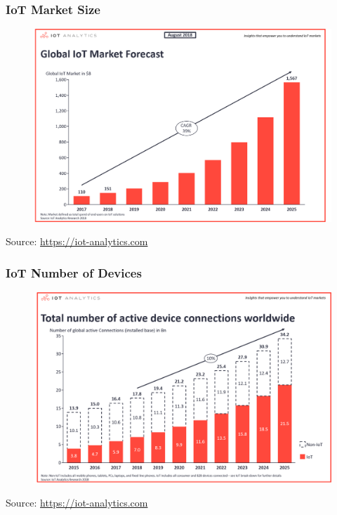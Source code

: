 \documentclass[aspectratio=169]{beamer}
\begin{document}
\begin{frame}
  \frametitle{IoT Market Size}
    \begin{figure}
      \centering
      \includegraphics[scale=0.15]{images/iot1.png}
    \end{figure}
    Source: \href{https://iot-analytics.com}{https://iot-analytics.com}
\end{frame}

\begin{frame}
  \frametitle{IoT Number of Devices}
    \begin{figure}
      \centering
      \includegraphics[scale=0.16]{images/iot2.png}
    \end{figure}
    Source: \href{https://iot-analytics.com}{https://iot-analytics.com}
\end{frame}
\end{document}
